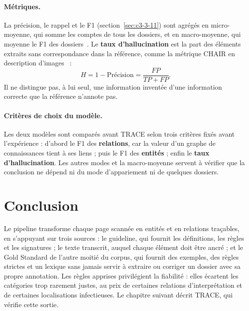 \paragraph{Métriques.}\label{sec:c4-metriques} La précision, le rappel et le F1 (section~\ref{sec:c3-3-11}) sont agrégés en micro-moyenne, qui somme les comptes de tous les dossiers, et en macro-moyenne, qui moyenne le F1 des dossiers~\cite{sokolova2009}. Le \textbf{taux d'hallucination} est la part des éléments extraits sans correspondance dans la référence, comme la métrique CHAIR en description d'images~\cite{rohrbach2018chair} :
\begin{equation}
H = 1 - \text{Précision} = \frac{FP}{TP + FP}.
\end{equation}
Il ne distingue pas, à lui seul, une information inventée d'une information correcte que la référence n'annote pas.

\paragraph{Critères de choix du modèle.}\label{sec:c4-selection} Les deux modèles sont comparés avant TRACE selon trois critères fixés avant l'expérience : d'abord le F1 des \textbf{relations}, car la valeur d'un graphe de connaissances tient à ses liens ; puis le F1 des \textbf{entités} ; enfin le \textbf{taux d'hallucination}. Les autres modes et la macro-moyenne servent à vérifier que la conclusion ne dépend ni du mode d'appariement ni de quelques dossiers.

\section{Conclusion}\label{sec:c4-conclusion}

Le pipeline transforme chaque page scannée en entités et en relations traçables, en s'appuyant sur trois sources : le guideline, qui fournit les définitions, les règles et les signatures ; le texte transcrit, auquel chaque élément doit être ancré ; et le Gold Standard de l'autre moitié du corpus, qui fournit des exemples, des règles strictes et un lexique sans jamais servir à extraire ou corriger un dossier avec sa propre annotation. Les règles apprises privilégient la fiabilité : elles écartent les catégories trop rarement justes, au prix de certaines relations d'interprétation et de certaines localisations infectieuses. Le chapitre suivant décrit TRACE, qui vérifie cette sortie.
